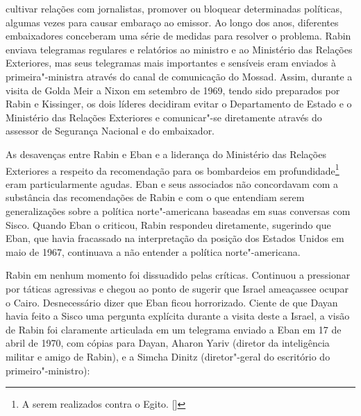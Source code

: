 cultivar relações com jornalistas, promover ou bloquear determinadas
políticas, algumas vezes para causar embaraço ao emissor. Ao longo dos
anos, diferentes embaixadores conceberam uma série de medidas para
resolver o problema. Rabin enviava telegramas regulares e relatórios ao
ministro e ao Ministério das Relações Exteriores, mas seus telegramas
mais importantes e sensíveis eram enviados à primeira"-ministra através
do canal de comunicação do Mossad. Assim, durante a visita de Golda Meir
a Nixon em setembro de 1969, tendo sido preparados por Rabin e
Kissinger, os dois líderes decidiram evitar o Departamento de Estado e o
Ministério das Relações Exteriores e comunicar"-se diretamente através do
assessor de Segurança Nacional e do embaixador.

As desavenças entre Rabin e Eban e a liderança do Ministério das Relações
Exteriores a respeito da recomendação para os bombardeios em
profundidade\footnote{A serem realizados contra o Egito. []} eram particularmente agudas. Eban e seus associados não concordavam com a substância das recomendações de
Rabin e com o que entendiam serem generalizações sobre a política
norte"-americana baseadas em suas conversas com Sisco. Quando Eban o
criticou, Rabin respondeu diretamente, sugerindo que Eban, que havia
fracassado na interpretação da posição dos Estados Unidos em maio de 1967,
continuava a não entender a política norte"-americana.

Rabin em nenhum momento foi dissuadido pelas críticas. Continuou a
pressionar por táticas agressivas e chegou ao ponto de sugerir que
Israel ameaçassee ocupar o Cairo. Desnecessário dizer que Eban ficou
horrorizado. Ciente de que Dayan havia feito a Sisco uma pergunta
explícita durante a visita deste a Israel, a visão de Rabin foi
claramente articulada em um telegrama enviado a Eban em 17 de abril de
1970, com cópias para Dayan, Aharon Yariv (diretor da inteligência
militar e amigo de Rabin), e a Simcha Dinitz (diretor"-geral do
escritório do primeiro"-ministro):

